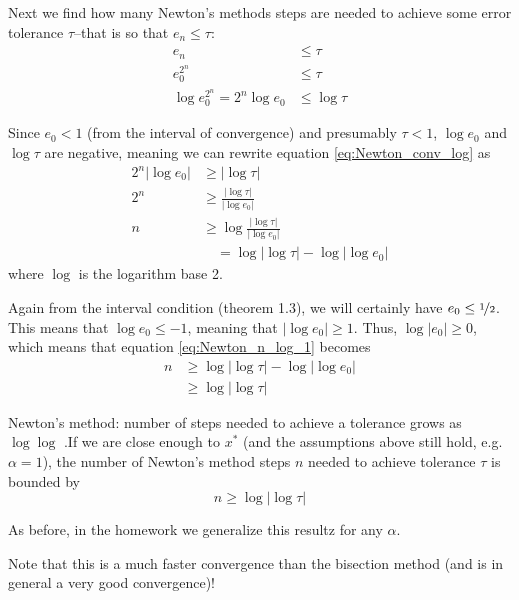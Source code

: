 \documentclass[12pt,letterpaper]{article}
\begin{document}
Next we find how many Newton's methods steps are needed to achieve some error tolerance $\tau$--that is so that $e_n \leq \tau$:
\begin{align}
	e_n &\leq \tau \\
	e_0^{2^n} &\leq \tau \\
	\log e_0^{2^n} = 2^n \log e_0 &\leq \log\tau \label{eq:Newton_conv_log}
\end{align}

Since $e_0 < 1$ (from the interval of convergence) and presumably $\tau < 1$, $\log e_0$ and $\log\tau$ are negative, meaning we can rewrite equation \ref{eq:Newton_conv_log} as
\begin{align}
	2^n \lvert \log e_0 \rvert &\geq \lvert \log \tau \rvert \\
	2^n &\geq \frac{\lvert \log \tau \rvert}{\lvert \log e_0 \rvert} \\
	n &\geq \log \frac{\lvert \log \tau \rvert}{\lvert \log e_0 \rvert} \\
	&\quad= \log \lvert \log \tau \rvert - \log \lvert \log e_0 \rvert \label{eq:Newton_n_log_1}
\end{align}
where $\log$ is the logarithm base 2.

Again from the interval condition (theorem 1.3), we will certainly have $e_0 \leq \nicefrac{1}{2}$. This means that $\log e_0 \leq -1$, meaning that $\lvert \log e_0 \rvert \geq 1$. Thus, $\log \lvert e_0 \rvert \geq 0$, which means that equation \ref{eq:Newton_n_log_1} becomes
\begin{align*}
	n &\geq \log \lvert \log \tau \rvert - \log \lvert \log e_0 \rvert \\
	&\geq \log \lvert \log \tau \rvert
\end{align*}

\begin{theo}{Newton's method: number of steps needed to achieve a tolerance grows as $\log \log$}
.If we are close enough to $x^*$ (and the assumptions above still hold, e.g. $\alpha=1$), the number of Newton's method steps $n$ needed to achieve tolerance $\tau$ is bounded by
\begin{equation}
	n \geq \log \lvert \log \tau \rvert
\end{equation}
\end{theo}
As before, in the homework we generalize this resultz for any $\alpha$.

Note that this is a much faster convergence than the bisection method (and is in general a very good convergence)!
\end{document}
